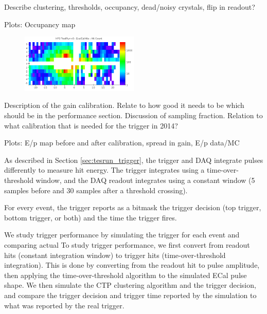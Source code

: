 Describe clustering, thresholds, occupancy, dead/noisy crystals, flip in readout?

Plots: Occupancy map

\begin{figure}[ht]
	\includegraphics[width=0.5\textwidth]{test2012/ecalperformance/hitrates}
	\caption{\small{}}
	\label{fig:hitrates}
\end{figure}

\vspace{1cm}{\bf ECal Calibration [Sho]}


Description of the gain calibration. Relate to how good it needs to be which should be in the performance section. Discussion of sampling fraction. Relation to what calibration that is needed for the trigger in 2014?

Plots: E/p map before and after calibration, spread in gain, E/p data/MC


\vspace{1cm}{\bf Trigger performance [Sho/Ben]}


As described in Section \ref{sec:tesrun_trigger}, the trigger and DAQ integrate pulses differently to measure hit energy. The trigger integrates using a time-over-threshold window, and the DAQ readout integrates using a constant window (5 samples before and 30 samples after a threshold crossing). 

For every event, the trigger reports as a bitmask the trigger decision (top trigger, bottom trigger, or both) and the time the trigger fires.

We study trigger performance by simulating the trigger for each event and comparing actual To study trigger performance, we first convert from readout hits (constant integration window) to trigger hits (time-over-threshold integration). 
This is done by converting from the readout hit to pulse amplitude, then applying the time-over-threshold algorithm to the simulated ECal pulse shape. 
We then simulate the CTP clustering algorithm and the trigger decision, and compare the trigger decision and trigger time reported by the simulation to what was reported by the real trigger.

